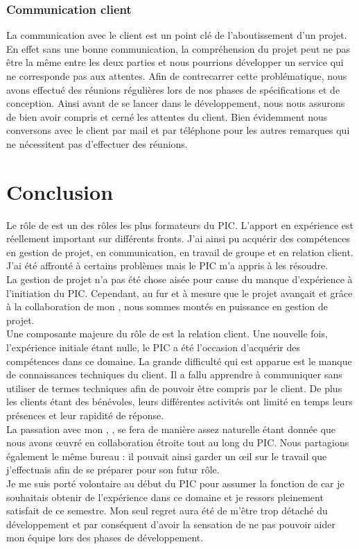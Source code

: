 \documentclass[asi]{picInsa}
\begin{document}
\subsection{Communication client}
La communication avec le client est un point clé de l'aboutissement d'un projet. En effet sans une bonne communication, la compréhension du projet peut ne pas être la même entre les deux parties et nous pourrions développer un service qui ne corresponde pas aux attentes. Afin de contrecarrer cette problématique, nous avons effectué des réunions régulières lors de nos phases de spécifications et de conception. Ainsi avant de se lancer dans le développement, nous nous assurons de bien avoir compris et cerné les attentes du client. Bien évidemment nous conversons avec le client par mail et par téléphone pour les autres remarques qui ne nécessitent pas d'effectuer des réunions.





\chapter{Conclusion}
Le rôle de \CP{} est un des rôles les plus formateurs du PIC. L'apport en expérience est réellement important sur différents fronts. J'ai ainsi pu acquérir des compétences en gestion de projet, en communication, en travail de groupe et en relation client. J'ai été affronté à certains problèmes mais le PIC m'a appris à les résoudre.\vspace{0.5cm}\\
La gestion de projet n'a pas été chose aisée pour cause du manque d’expérience à l'initiation du PIC. Cependant, au fur et à mesure que le projet avançait et grâce à la collaboration de mon \CPA{} \Pierre, nous sommes montés en puissance en gestion de projet.\vspace{0.5cm}\\
Une composante majeure du rôle de \CP{} est la relation client. Une nouvelle fois, l'expérience initiale étant nulle, le PIC a été l'occasion d'acquérir des compétences dans ce domaine. La grande difficulté qui est apparue est le manque de connaissances techniques du client. Il a fallu apprendre à communiquer sans utiliser de termes techniques afin de pouvoir être compris par le client. De plus les clients étant des bénévoles, leurs différentes activités ont limité en temps leurs présences et leur rapidité de réponse.\vspace{0.5cm}\\
La passation avec mon \CPA{}, \Pierre, se fera de manière assez naturelle étant donnée que nous avons œuvré en collaboration étroite tout au long du PIC. Nous partagions également le même bureau : il pouvait ainsi garder un œil sur le travail que j'effectuais afin de se préparer pour son futur rôle.\vspace{0.5cm}\\
Je me suis porté volontaire au début du PIC pour assumer la fonction de \CP{} car je souhaitais obtenir de l'expérience dans ce domaine et je ressors pleinement satisfait de ce semestre. Mon seul regret aura été de m'être trop détaché du développement et par conséquent d'avoir la sensation de ne pas pouvoir aider mon équipe lors des phases de développement.


\pageQuatriemeCouverture
\end{document}
